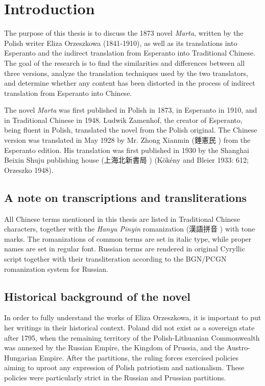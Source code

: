 \chapter{Introduction}

The purpose of this thesis is to discuss the 1873 novel \textit{Marta}, written by the Polish writer Eliza Orzeszkowa (1841-1910), as well as its translations into Esperanto and the indirect translation from Esperanto into Traditional Chinese.
The goal of the research is to find the similarities and differences between all three versions, analyze the translation techniques used by the two translators, and determine whether any content has been distorted in the process of indirect translation from Esperanto into Chinese.

The novel \textit{Marta} was first published in Polish in 1873, in Esperanto in 1910, and in Traditional Chinese in 1948.
Ludwik Zamenhof, the creator of Esperanto, being fluent in Polish, translated the novel from the Polish original.
The Chinese version was translated in May 1928 by Mr. Zhong Xianmin (錘憲民 ) from the Esperanto edition.
His translation was first published in 1930 by the Shanghai Beixin Shuju publishing house (上海北新書局 )
(Kökény and Bleier 1933: 612; Orzeszko 1948).

\section{A note on transcriptions and transliterations}

All Chinese terms mentioned in this thesis are listed in Traditional Chinese characters, together with the \textit{Hanyu Pinyin} romanization (漢語拼音 ) with tone marks.
The romanizations of common terms are set in italic type, while proper names are set in regular font.
Russian terms are rendered in original Cyryllic script together with their transliteration according to the BGN/PCGN romanization system for Russian.

\section{Historical background of the novel}

In order to fully understand the works of Eliza Orzeszkowa, it is important to put her writings in their historical context.
Poland did not exist as a sovereign state after 1795, when the remaining territory of the Polish-Lithuanian Commonwealth was annexed by the Russian Empire, the  Kingdom of Prussia, and the Austro-Hungarian Empire.
After the partitions, the ruling forces exercised policies aiming to uproot any expression of Polish patriotism and nationalism. These policies were particularly strict in the Russian and Prussian partitions.

